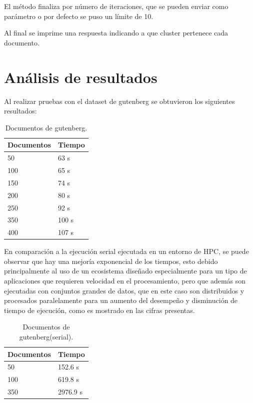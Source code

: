 El método finaliza por número de iteraciones, que se pueden enviar como parámetro
o por defecto se puso un límite de 10.

Al final se imprime una respuesta indicando a que cluster pertenece cada documento.

\section{Análisis de resultados}
Al realizar pruebas con el dataset de gutenberg se obtuvieron los siguientes resultados:
\begin{table}[htbp]
\begin{center}
\begin{tabular}{|l|l|}
\hline
Documentos & Tiempo\\
\hline \hline
50 & 63 s \\ \hline
100 & 65 s \\ \hline
150 & 74 s \\ \hline
200 & 80 s \\ \hline
250 & 92 s \\ \hline
350 & 100 s \\ \hline
400 & 107 s \\ \hline
\end{tabular}
\caption{Documentos de gutenberg.}
\label{tabla:sencilla}
\end{center}
\end{table}

En comparación a la ejecución serial ejecutada en un entorno de HPC, se puede observar que hay una mejoría exponencial de los tiempos, esto debido principalmente al uso de un ecosistema diseñado especialmente para un tipo de aplicaciones que requieren velocidad en el procesamiento, pero que además son ejecutadas con conjuntos grandes de datos, que en este caso son distribuidos y procesados paralelamente para un aumento del desempeño y disminución de tiempo de ejecución, como es mostrado en las cifras presentas.

\begin{table}[htbp]
\begin{center}
\begin{tabular}{|l|l|}
\hline
Documentos & Tiempo\\
\hline \hline
50 & 152.6 s \\ \hline
100 & 619.8 s \\ \hline
350 & 2976.9  s \\ \hline
\end{tabular}
\caption{Documentos de gutenberg(serial).}
\label{tabla:sencilla1}
\end{center}
\end{table}

